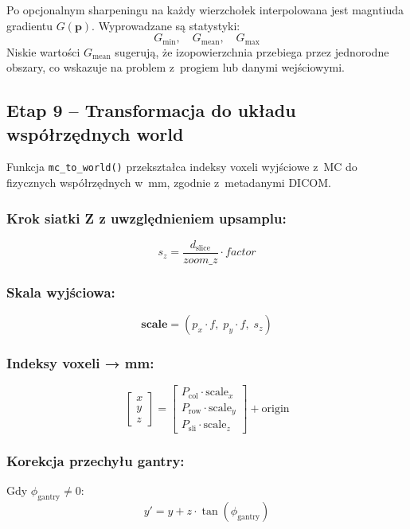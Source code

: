 \documentclass[12pt,a4paper]{article}
\begin{document}
Po opcjonalnym sharpeningu na każdy wierzchołek interpolowana jest magntiuda
gradientu $G(\mathbf{p})$. Wyprowadzane są statystyki:
\[
  G_{\min},\quad G_{\text{mean}},\quad G_{\max}
\]
Niskie wartości $G_{\text{mean}}$ sugerują, że izopowierzchnia przebiega przez
jednorodne obszary, co wskazuje na problem z~progiem lub danymi wejściowymi.

\subsection{Etap 9 -- Transformacja do układu współrzędnych world}
\label{sec:world}

Funkcja \texttt{mc\_to\_world()} przekształca indeksy voxeli wyjściowe z~MC
do fizycznych współrzędnych w~mm, zgodnie z~metadanymi DICOM.

\subsubsection*{Krok siatki Z z uwzględnieniem upsamplu:}
\[
  s_z = \frac{d_{\text{slice}}}{\textit{zoom\_z}} \cdot \textit{factor}
\]

\subsubsection*{Skala wyjściowa:}
\[
  \mathbf{scale} = (p_x \cdot f,\; p_y \cdot f,\; s_z)
\]

\subsubsection*{Indeksy voxeli → mm:}
\[
  \begin{bmatrix} x \\ y \\ z \end{bmatrix} =
  \begin{bmatrix} P_{\text{col}} \cdot \mathrm{scale}_x \\
                  P_{\text{row}} \cdot \mathrm{scale}_y \\
                  P_{\text{sli}} \cdot \mathrm{scale}_z \end{bmatrix}
  + \text{origin}
\]

\subsubsection*{Korekcja przechyłu gantry:}
Gdy $\phi_{\text{gantry}} \neq 0$:
\[
  y' = y + z \cdot \tan(\phi_{\text{gantry}})
\]
\end{document}
